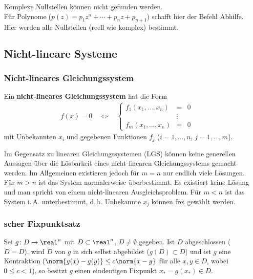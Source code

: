 Komplexe Nullstellen können nicht gefunden werden. \\
Für Polynome  ($p(z) = p_1 z^n + \dotsb + p_n z + p_{n+1}$)
schafft hier der Befehl  Abhilfe.
Hier werden alle Nullstellen (reell wie komplex) bestimmt.

\pagebreak

\subsection{%
    Nicht-lineare Systeme%
}

\subsubsection{%
    Nicht-lineares Gleichungssystem%
}

Ein \textbf{nicht-lineares Gleichungssystem} hat die Form
\begin{align*}
    f(x) = 0 \quad\Leftrightarrow\quad
    \left\{\begin{array}{rcl}
        f_1(x_1, \dotsc, x_n) & = & 0 \\
        & \vdots \\
        f_m(x_1, \dotsc, x_n) & = & 0
    \end{array}\right.
\end{align*}
mit Unbekannten $x_i$ und gegebenen Funktionen $f_j$ ($i = 1, \dotsc, n$,
$j = 1, \dotsc, m$).

Im Gegensatz zu linearen Gleichungssystemen (LGS) können keine generellen
Aussagen über die Lösbarkeit eines nicht-linearen Gleichungssystems gemacht
werden.
Im Allgemeinen existieren jedoch für $m = n$ nur endlich viele Lösungen.
Für $m > n$ ist das System normalerweise überbestimmt.
Es existiert keine Lösung und man spricht von einem
nicht-linearen Ausgleichsproblem.
Für $m < n$ ist das System i.\,A. unterbestimmt,
d.\,h. Unbekannte $x_j$ können frei gewählt werden.

\subsubsection{%
    scher Fixpunktsatz%
}

Sei $g\colon D \rightarrow \real^n$ mit $D \subset \real^n$,
$D \not= \emptyset$ gegeben.
Ist $D$ abgeschlossen ($D = \overline{D}$),
wird $D$ von $g$ in sich selbst abgebildet ($g(D) \subset D$)
und ist $g$ eine Kontraktion ($\norm{g(x) - g(y)} \le c \norm{x - y}$
für alle $x, y \in D$, wobei $0 \le c < 1$),
so besitzt $g$ einen eindeutigen Fixpunkt $x_\ast = g(x_\ast) \in D$.

